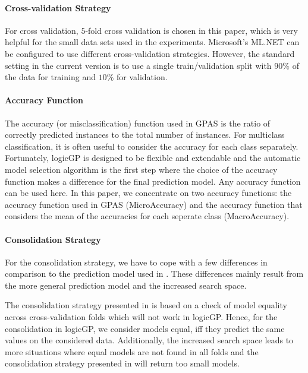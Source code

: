 \documentclass[dvipsnames,format=sigconf,anonymous=false,review=false]{acmart}
\begin{document}

 \paragraph{Cross-validation Strategy}

 For cross validation, $5$-fold cross validation is chosen in this paper, which is very helpful for the small data sets used in the experiments. Microsoft's ML.NET can be configured to use different cross-validation strategies. However, the standard setting in the current version is to use a single train/validation split with $90\%$ of the data for training and $10\%$ for validation. 
 
 \paragraph{Accuracy Function}

  The accuracy (or misclassification) function used in GPAS is the ratio of correctly predicted instances to the total number of instances. For multiclass classification, it is often useful to consider the accuracy for each class separately. Fortunately, logicGP is designed to be flexible and extendable and the automatic model selection algorithm is the first step where the choice of the accuracy function makes a difference for the final prediction model. Any accuracy function can be used here. In this paper, we concentrate on two accuracy functions: the accuracy function used in GPAS (MicroAccuracy) and the accuracy function that considers the mean of the accuracies for each seperate class (MacroAccuracy).

 
  \paragraph{Consolidation Strategy}
 
  For the consolidation strategy, we have to cope with a few differences in comparison to the prediction model used in \cite{bioinformatics24}. These differences mainly result from the more general prediction model and the  increased search space. 

 The consolidation strategy presented in \cite{bioinformatics24} is based on a check of model equality across cross-validation folds which will not work in logicGP. Hence, for the consolidation in logicGP, we consider models equal, iff they predict the same values on the considered data. Additionally, the increased search space leads to more situations where equal models are not found in all folds and the consolidation strategy presented in \cite{bioinformatics24} will return too small models.
\end{document}
